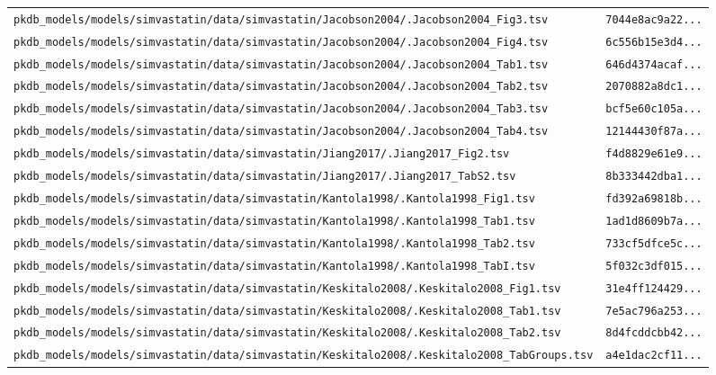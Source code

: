 \begin{longtable}{ll}
\texttt{pkdb\_models/models/simvastatin/data/simvastatin/Jacobson2004/.Jacobson2004\_Fig3.tsv} & \texttt{7044e8ac9a22...} \\
\texttt{pkdb\_models/models/simvastatin/data/simvastatin/Jacobson2004/.Jacobson2004\_Fig4.tsv} & \texttt{6c556b15e3d4...} \\
\texttt{pkdb\_models/models/simvastatin/data/simvastatin/Jacobson2004/.Jacobson2004\_Tab1.tsv} & \texttt{646d4374acaf...} \\
\texttt{pkdb\_models/models/simvastatin/data/simvastatin/Jacobson2004/.Jacobson2004\_Tab2.tsv} & \texttt{2070882a8dc1...} \\
\texttt{pkdb\_models/models/simvastatin/data/simvastatin/Jacobson2004/.Jacobson2004\_Tab3.tsv} & \texttt{bcf5e60c105a...} \\
\texttt{pkdb\_models/models/simvastatin/data/simvastatin/Jacobson2004/.Jacobson2004\_Tab4.tsv} & \texttt{12144430f87a...} \\
\texttt{pkdb\_models/models/simvastatin/data/simvastatin/Jiang2017/.Jiang2017\_Fig2.tsv} & \texttt{f4d8829e61e9...} \\
\texttt{pkdb\_models/models/simvastatin/data/simvastatin/Jiang2017/.Jiang2017\_TabS2.tsv} & \texttt{8b333442dba1...} \\
\texttt{pkdb\_models/models/simvastatin/data/simvastatin/Kantola1998/.Kantola1998\_Fig1.tsv} & \texttt{fd392a69818b...} \\
\texttt{pkdb\_models/models/simvastatin/data/simvastatin/Kantola1998/.Kantola1998\_Tab1.tsv} & \texttt{1ad1d8609b7a...} \\
\texttt{pkdb\_models/models/simvastatin/data/simvastatin/Kantola1998/.Kantola1998\_Tab2.tsv} & \texttt{733cf5dfce5c...} \\
\texttt{pkdb\_models/models/simvastatin/data/simvastatin/Kantola1998/.Kantola1998\_TabI.tsv} & \texttt{5f032c3df015...} \\
\texttt{pkdb\_models/models/simvastatin/data/simvastatin/Keskitalo2008/.Keskitalo2008\_Fig1.tsv} & \texttt{31e4ff124429...} \\
\texttt{pkdb\_models/models/simvastatin/data/simvastatin/Keskitalo2008/.Keskitalo2008\_Tab1.tsv} & \texttt{7e5ac796a253...} \\
\texttt{pkdb\_models/models/simvastatin/data/simvastatin/Keskitalo2008/.Keskitalo2008\_Tab2.tsv} & \texttt{8d4fcddcbb42...} \\
\texttt{pkdb\_models/models/simvastatin/data/simvastatin/Keskitalo2008/.Keskitalo2008\_TabGroups.tsv} & \texttt{a4e1dac2cf11...} \\

\end{longtable}
